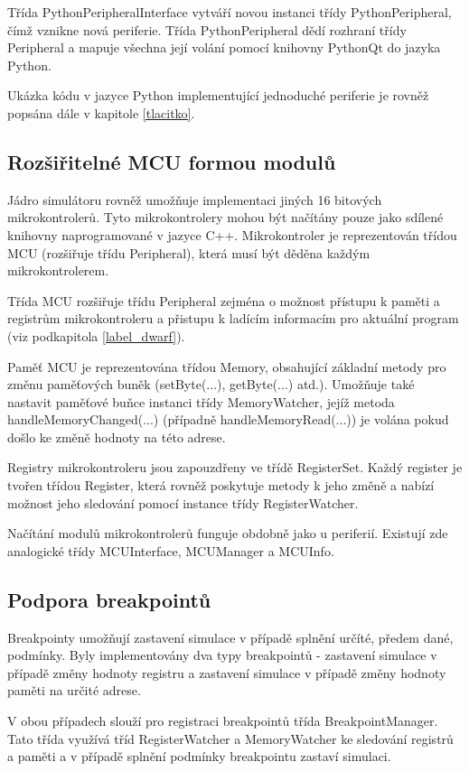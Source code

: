Třída PythonPeripheralInterface vytváří novou instanci třídy PythonPeripheral, čímž vznikne nová periferie. Třída PythonPeripheral dědí rozhraní třídy Peripheral a mapuje všechna její volání pomocí knihovny PythonQt do jazyka Python.

Ukázka kódu v jazyce Python implementující jednoduché periferie je rovněž popsána dále v kapitole \ref{tlacitko}.

\subsection{Rozšiřitelné MCU formou modulů}

Jádro simulátoru rovněž umožňuje implementaci jiných 16 bitových mikrokontrolerů. Tyto mikrokontrolery mohou být načítány pouze jako sdílené knihovny naprogramované v jazyce C++. Mikrokontroler je reprezentován třídou MCU (rozšiřuje třídu Peripheral), která musí být děděna každým mikrokontrolerem.

Třída MCU rozšiřuje třídu Peripheral zejména o možnost přístupu k paměti a registrům mikrokontroleru a přistupu k ladícím informacím pro aktuální program (viz podkapitola \ref{label_dwarf}).

Paměť MCU je reprezentována třídou Memory, obsahující základní metody pro změnu paměťových buněk (setByte(...), getByte(...) atd.). Umožňuje také nastavit paměťové buňce instanci třídy MemoryWatcher, jejíž metoda handleMemoryChanged(...) (případně handleMemoryRead(...)) je volána pokud došlo ke změně hodnoty na této adrese.

Registry mikrokontroleru jsou zapouzdřeny ve třídě RegisterSet. Každý register je tvořen třídou Register, která rovněž poskytuje metody k jeho změně a nabízí možnost jeho sledování pomocí instance třídy RegisterWatcher.

Načítání modulů mikrokontrolerů funguje obdobně jako u periferií. Existují zde analogické třídy MCUInterface, MCUManager a MCUInfo.

\subsection{Podpora breakpointů}

Breakpointy umožňují zastavení simulace v případě splnění určíté, předem dané, podmínky. Byly implementovány dva typy breakpointů - zastavení simulace v případě změny hodnoty registru a zastavení simulace v případě změny hodnoty paměti na určité adrese.

V obou případech slouží pro registraci breakpointů třída BreakpointManager. Tato třída využívá tříd RegisterWatcher a MemoryWatcher ke sledování registrů a paměti a v případě splnění podmínky breakpointu zastaví simulaci.

